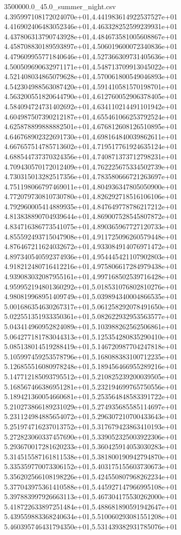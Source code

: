 \begin{filecontents*}{3500000.0_45.0_summer_night.csv}
4.395997108172024070e+01,4.441983614922537527e+01
4.416902406483052346e+01,4.463328252599239931e+01
4.437806313790743928e+01,4.484673581005608867e+01
4.458708830189593897e+01,4.506019600072340836e+01
4.479609955771840646e+01,4.527366309731405636e+01
4.500509690632971171e+01,4.548713709913045022e+01
4.521408034865079628e+01,4.570061800549046893e+01
4.542304988563087420e+01,4.591410581570198701e+01
4.563200551820644790e+01,4.612760052906378405e+01
4.584094724731402692e+01,4.634110214491101942e+01
4.604987507390212187e+01,4.655461066253792524e+01
4.625878899888882501e+01,4.676812608126510895e+01
4.646768902322691730e+01,4.698164840039862611e+01
4.667657514785713602e+01,4.719517761924635124e+01
4.688544737370324356e+01,4.740871373712798231e+01
4.709430570172012409e+01,4.762225675334502739e+01
4.730315013282517356e+01,4.783580666721263697e+01
4.751198066797469011e+01,4.804936347805050900e+01
4.772079730810730780e+01,4.826292718516106106e+01
4.792960005414889935e+01,4.847649778786217212e+01
4.813838890704939644e+01,4.869007528545807872e+01
4.834716386773541075e+01,4.890365967727120733e+01
4.855592493715047908e+01,4.911725096260579448e+01
4.876467211624032672e+01,4.933084914076971472e+01
4.897340540592374936e+01,4.954445421107902803e+01
4.918212480716412216e+01,4.975806617284979438e+01
4.939083032087955161e+01,4.997168502539716428e+01
4.959952194801360292e+01,5.018531076802810276e+01
4.980819968951409749e+01,5.039894340004866535e+01
5.001686354630267317e+01,5.061258292078491650e+01
5.022551351933350361e+01,5.082622932953563577e+01
5.043414960952824089e+01,5.103988262562506861e+01
5.064277181783044313e+01,5.125354280835290410e+01
5.085138014519288419e+01,5.146720987704247818e+01
5.105997459253578796e+01,5.168088383100712235e+01
5.126855516080978248e+01,5.189456466955289216e+01
5.147712185093795512e+01,5.210825239200039505e+01
5.168567466386951281e+01,5.232194699765750556e+01
5.189421360054660681e+01,5.253564848583391722e+01
5.210273866189231029e+01,5.274935685585114697e+01
5.231124984885654072e+01,5.296307210700433643e+01
5.251974716237013752e+01,5.317679423863410193e+01
5.272823060337457690e+01,5.339052325003922306e+01
5.293670017281620233e+01,5.360425914053030283e+01
5.314515587161811538e+01,5.381800190942794870e+01
5.335359770073306152e+01,5.403175155603730673e+01
5.356202566108198226e+01,5.424550807968262234e+01
5.377043975361410588e+01,5.445927147966995108e+01
5.397883997926663113e+01,5.467304175530262000e+01
5.418722633897251484e+01,5.488681890591942647e+01
5.439559883368240634e+01,5.510060293081551208e+01
5.460395746431794350e+01,5.531439382931785076e+01

\end{filecontents*}
